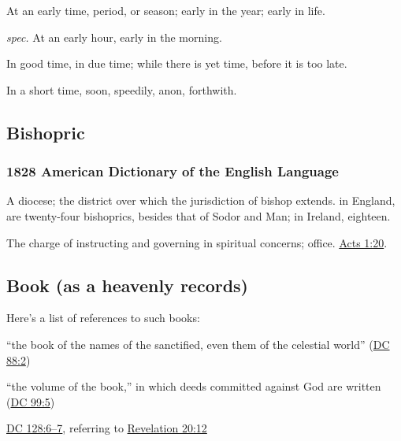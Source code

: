 			\begin{compactitem}
				\item[1] At an early time, period, or season; early in the year; early in life.
				\item[2] \textit{spec.} At an early hour, early in the morning.
				\item[3] In good time, in due time; while there is yet time, before it is too late.
				\item[4] In a short time, soon, speedily, anon, forthwith.
			\end{compactitem}
			
	\subsection{Bishopric} %
		\label{BISHOPRIC}
		
		\subsubsection{1828 American Dictionary of the English Language}
		
			\begin{compactitem}
				\item[1] A diocese; the district over which the jurisdiction of bishop extends. in England, are twenty-four bishoprics, besides that of Sodor and Man; in Ireland, eighteen.
				\item[2] The charge of instructing and governing in spiritual concerns; office. \hyperref[ACTS-1-20]{Acts 1:20}.
			\end{compactitem}
			
	\subsection{Book (as a heavenly records)} %
		\label{BOOK}
		
		Here's a list of references to such books:
		
		\begin{compactitem}
			\item ``the book of the names of the sanctified, even them of the celestial world'' (\hyperref[DC88-2]{DC 88:2})
			\item ``the volume of the book,'' in which deeds committed against God are written (\hyperref[DC99-5]{DC 99:5})
			\item \hyperref[DC128-6]{DC 128:6--7}, referring to \hyperref[REVELATIONNT-20-12]{Revelation 20:12}
		\end{compactitem}

